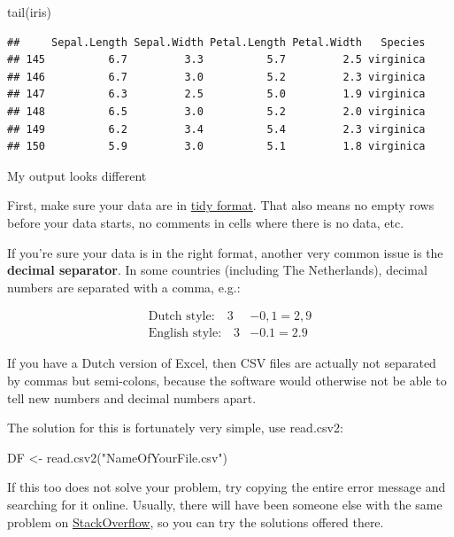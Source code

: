 \documentclass[
]{book}
\newenvironment{Shaded}{\begin{snugshade}}{\end{snugshade}}
\newcommand{\FunctionTok}[1]{\textcolor[rgb]{0.00,0.00,0.00}{#1}}
\newcommand{\NormalTok}[1]{#1}
\newcommand{\OtherTok}[1]{\textcolor[rgb]{0.56,0.35,0.01}{#1}}
\newcommand{\StringTok}[1]{\textcolor[rgb]{0.31,0.60,0.02}{#1}}
\begin{document}
\begin{Shaded}
\begin{Highlighting}[]
\FunctionTok{tail}\NormalTok{(iris)}
\end{Highlighting}
\end{Shaded}

\begin{verbatim}
##     Sepal.Length Sepal.Width Petal.Length Petal.Width   Species
## 145          6.7         3.3          5.7         2.5 virginica
## 146          6.7         3.0          5.2         2.3 virginica
## 147          6.3         2.5          5.0         1.9 virginica
## 148          6.5         3.0          5.2         2.0 virginica
## 149          6.2         3.4          5.4         2.3 virginica
## 150          5.9         3.0          5.1         1.8 virginica
\end{verbatim}

My output looks different

First, make sure your data are in \protect\hyperlink{tidy}{tidy format}. That also means no empty rows before your data starts, no comments in cells where there is no data, etc.

If you're sure your data is in the right format, another very common issue is the \textbf{decimal separator}. In some countries (including The Netherlands), decimal numbers are separated with a comma, e.g.:

\[\begin{aligned}\text{Dutch style:} \quad 3 &- 0{,}1 = 2{,}9 \\
\text{English style:} \quad 3 &- 0.1 = 2.9
\end{aligned}\]

If you have a Dutch version of Excel, then CSV files are actually not separated by commas but semi-colons, because the software would otherwise not be able to tell new numbers and decimal numbers apart.

The solution for this is fortunately very simple, use read.csv2:

\begin{Shaded}
\begin{Highlighting}[]
\NormalTok{DF }\OtherTok{\textless{}{-}} \FunctionTok{read.csv2}\NormalTok{(}\StringTok{"NameOfYourFile.csv"}\NormalTok{)}
\end{Highlighting}
\end{Shaded}

If this too does not solve your problem, try copying the entire error message and searching for it online. Usually, there will have been someone else with the same problem on \href{stackoverflow.com}{StackOverflow}, so you can try the solutions offered there.
\end{document}
